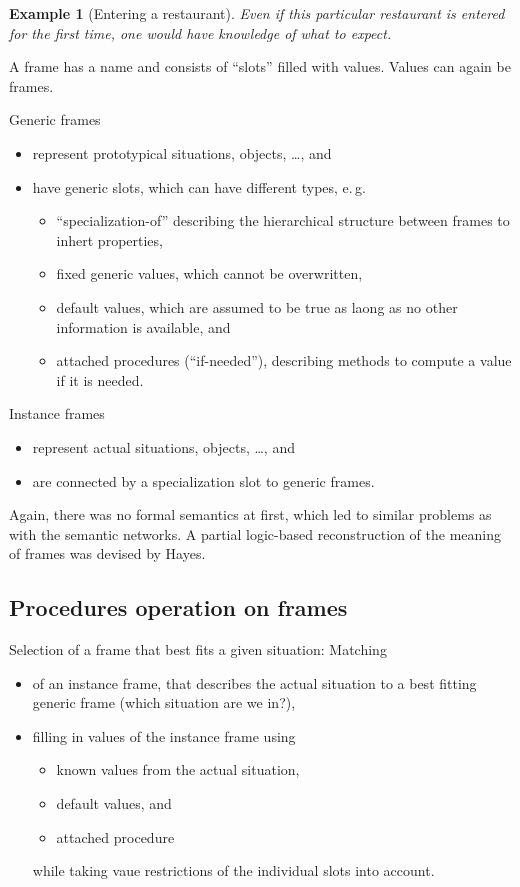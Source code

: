 \documentclass[openany]{scrbook}
\theoremstyle{break}
\newtheorem{NumberedExample}[Theorem]{Example}
\theoremstyle{nonumberbreak}
\theoremstyle{nonumberplain}
\theoremstyle{nonumberbreak}
\newcommand{\eg}{e{.}\,g{.}\xspace}
\begin{document}
\begin{NumberedExample}[Entering a restaurant]
  \label{ex:1.1}
  Even if this particular restaurant is entered for the first time,
  one would have knowledge of what to expect.
\end{NumberedExample}

A frame has a name and consists of ``slots'' filled with
values. Values can again be frames.

Generic frames
\begin{itemize}
\item represent prototypical situations, objects, \ldots, and
\item have generic slots, which can have different types, \eg
  \begin{itemize}
  \item ``specialization-of'' describing the hierarchical structure
    between frames to inhert properties,
  \item fixed generic values, which cannot be overwritten,
  \item default values, which are assumed to be true as laong as no
    other information is available, and
  \item attached procedures (``if-needed''), describing methods to
    compute a value if it is needed.
  \end{itemize}
\end{itemize}

Instance frames
\begin{itemize}
\item represent actual situations, objects, \ldots, and
\item are connected by a specialization slot to generic frames.
\end{itemize}

Again, there was no formal semantics at first, which led to similar
problems as with the semantic networks. A partial logic-based
reconstruction of the meaning of frames was devised by Hayes.

\subsection{Procedures operation on frames}
Selection of a frame that best fits a given situation: Matching
\begin{itemize}
\item of an instance frame, that describes the actual situation to a
  best fitting generic frame (which situation are we in?),
\item filling in values of the instance frame using
  \begin{itemize}
  \item known values from the actual situation,
  \item default values, and
  \item attached procedure
  \end{itemize}
  while taking vaue restrictions of the individual slots into
  account.
\end{itemize}
\end{document}
